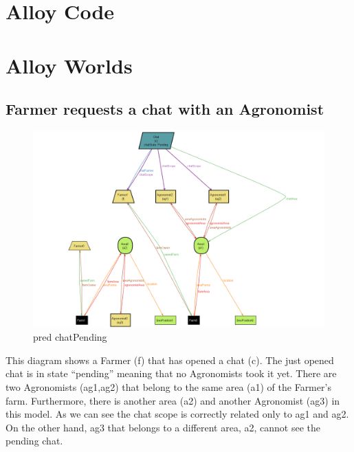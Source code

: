 \documentclass[10pt]{report}
\begin{document}
\section{Alloy Code}

\section{Alloy Worlds}
\subsection{Farmer requests a chat with an Agronomist}
\begin{figure}[H]
    \centering
    \includegraphics[width=450px]{Alloy/chatPending.png}
    \caption{pred chatPending}
\end{figure}
This diagram shows a Farmer (f) that has opened a chat (c). The just opened chat is in state “pending” meaning that no Agronomists took it yet. There are two Agronomists (ag1,ag2) that belong to the same area (a1) of the Farmer’s farm. Furthermore, there is another area (a2) and another Agronomist (ag3) in this model. As we can see the chat scope is correctly related only to ag1 and ag2. On the other hand, ag3 that belongs to a different area, a2, cannot see the pending chat.
\end{document}
